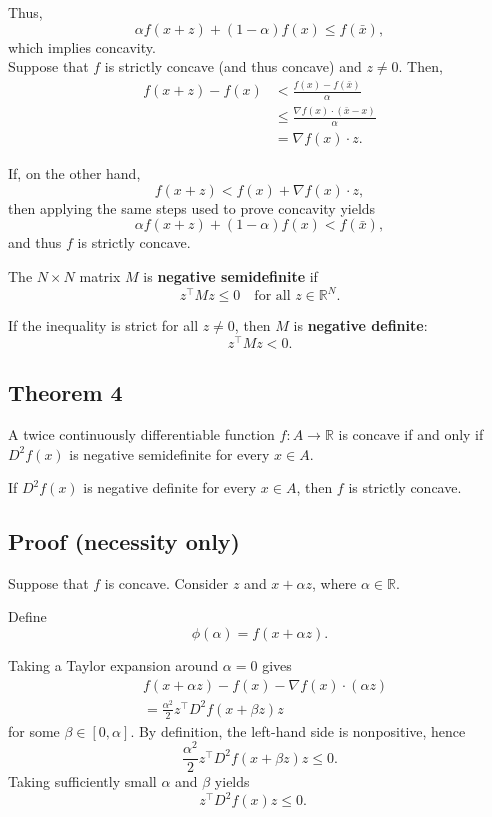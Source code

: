 \begin{tcolorbox}[breakable, colback=white]
Thus,
\[
\alpha f(x+z) + (1-\alpha) f(x) \le f(\bar{x}),
\]
which implies concavity.\\


Suppose that $f$ is strictly concave (and thus concave) and $z \neq 0$. Then,
\[
\begin{aligned}
f(x+z) - f(x)
&< \frac{f(x) - f(\bar{x})}{\alpha} \\
&\le \frac{\nabla f(x)\cdot (\bar{x}-x)}{\alpha}\\
&= \nabla f(x)\cdot z
.
\end{aligned}
\]

If, on the other hand,
\[
f(x+z) < f(x) + \nabla f(x)\cdot z,
\]
then applying the same steps used to prove concavity yields
\[
\alpha f(x+z) + (1-\alpha) f(x) < f(\bar{x}),
\]
and thus $f$ is strictly concave.

\end{tcolorbox}


\vspace{1em}

The $N \times N$ matrix $M$ is \textbf{negative semidefinite} if
\[
z^\top M z \le 0 \quad \text{for all } z \in \mathbb{R}^N.
\]

If the inequality is strict for all $z \neq 0$, then $M$ is
\textbf{negative definite}:
\[
z^\top M z < 0.
\]


\begin{tcolorbox}[breakable, colback=white]
\subsection*{Theorem 4}

A twice continuously differentiable function $f : A \to \mathbb{R}$ is concave
if and only if $D^2 f(x)$ is negative semidefinite for every $x \in A$.

If $D^2 f(x)$ is negative definite for every $x \in A$, then $f$ is strictly concave.

\subsection*{Proof (necessity only)}

Suppose that $f$ is concave. Consider $z$ and $x + \alpha z$, where $\alpha \in \mathbb{R}$.

Define
\[
\phi(\alpha) = f(x + \alpha z).
\]

Taking a Taylor expansion around $\alpha = 0$ gives
\[
\begin{aligned}
&f(x+\alpha z) - f(x) - \nabla f(x)\cdot (\alpha z)\\
&= \frac{\alpha^2}{2} z^\top D^2 f(x + \beta z) z
\end{aligned}
\]
for some $\beta \in [0,\alpha]$. By definition, the left-hand side is nonpositive, hence
\[
\frac{\alpha^2}{2} z^\top D^2 f(x+\beta z) z \le 0.
\]
Taking sufficiently small $\alpha$ and $\beta$ yields
\[
z^\top D^2 f(x) z \le 0. \quad 
\]

\end{tcolorbox}



